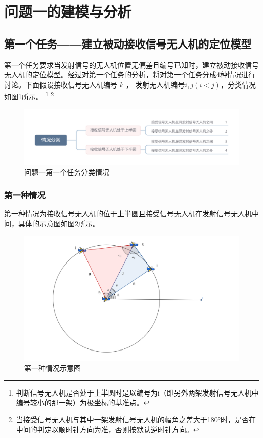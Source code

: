 \documentclass[withoutpreface,bwprint]{cumcmthesis} %
\begin{document}
\section{问题一的建模与分析}
\subsection{第一个任务——建立被动接收信号无人机的定位模型}\label{1.1}
第一个任务要求当发射信号的无人机位置无偏差且编号已知时，建立被动接收信号无人机的定位模型。经过对第一个任务的分析，将对第一个任务分成4种情况进行讨论。下面假设接收信号无人机编号 $k$ ， 发射无人机编号$i,j (i<j)$，分类情况如图\ref{fig:classification}所示。
\footnote{判断信号无人机是否处于上半圆时是以编号为i（即另外两架发射信号无人机中编号较小的那一架）为极坐标的基准点。}
\footnote{当接受信号无人机与其中一架发射信号无人机的幅角之差大于180°时，是否在中间的判定以顺时针方向为准，否则按默认逆时针方向。}
\begin{figure}[H]
    \centering
    \includegraphics[width=1.0\textwidth]{figures/情况分类.png}
    \caption{问题一第一个任务分类情况}
    \label{fig:classification}
    
\end{figure}


\normalsize

\subsubsection{第一种情况}
第一种情况为接收信号无人机的位于上半圆且接受信号无人机在发射信号无人机中间，具体的示意图如图\ref{fig:case1}所示。

\begin{figure}[H]
    \centering
    \includegraphics[width=1.0\textwidth]{figures/case 1.png}
    \caption{第一种情况示意图}
    \label{fig:case1}
    
\end{figure}
\end{document}
